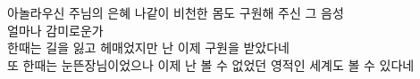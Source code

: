 아놀라우신 주님의 은혜 나같이 비천한
몸도 구원해 주신 그 음성\\
얼마나 감미로운가\\
한때는 길을 잃고 헤매었지만
난 이제 구원을 받았다네\\
또 한때는 눈뜬장님이었으나 이제 난 볼 수
없었던 영적인 세계도 볼 수 있다네\\
